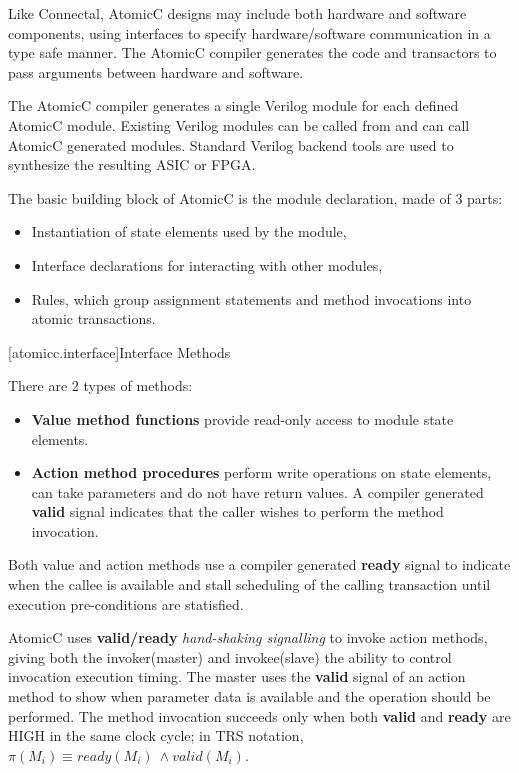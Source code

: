 Like Connectal\cite{king2015software}, AtomicC designs may include both hardware and
software components, using interfaces to specify hardware/software communication
in a type safe manner. The AtomicC compiler generates the code and transactors to pass
arguments between hardware and software.

The AtomicC compiler 
generates a single Verilog module for each defined AtomicC module.
Existing Verilog modules can be called from and can call AtomicC
generated modules.
Standard Verilog backend tools are used to synthesize
the resulting ASIC or FPGA.

The basic building block of AtomicC is the module declaration, made of 3 parts:
\begin{itemize}
\item Instantiation of state elements used by the module,
\item Interface declarations for interacting with other modules,
\item Rules, which group assignment statements and method invocations into atomic transactions.
\end{itemize}

[atomicc.interface]{Interface Methods}

There are 2 types of methods:
\begin{itemize}
\item \textbf{Value method functions} provide read-only access to module state elements.
\item \textbf{Action method procedures} perform write operations on state elements,
can take parameters and do not have return values.
A compiler generated
\textbf{valid} signal indicates that the caller wishes to perform the method invocation.
\end{itemize}

Both value and action methods use a compiler generated \textbf{ready} signal
to indicate when the callee is available and
stall scheduling of the calling transaction until
execution pre-conditions are statisfied.

AtomicC uses \textbf{valid/ready} \textit{hand-shaking signalling}
\cite{Fletcher2009, AXISpec} to invoke action methods,
giving both the invoker(master) and invokee(slave) the ability to control invocation
execution timing.
The master uses the \textbf{valid} signal
of an action method to show when parameter data is available
and the operation should be performed.
The method invocation succeeds only when
both \textbf{valid} and \textbf{ready} are HIGH in the same clock cycle;
in TRS notation\cite[p.~22]{Hoe:Thesis}, $\pi(M_{i}) \equiv ready(M_{i})\ \wedge valid(M_{i})$.

